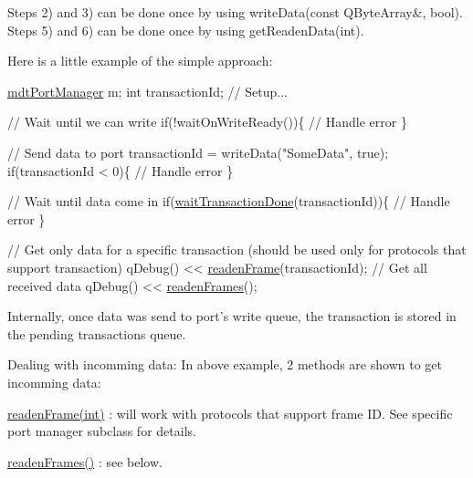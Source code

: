 Steps 2) and 3) can be done once by using write\-Data(const Q\-Byte\-Array\&, bool). Steps 5) and 6) can be done once by using get\-Readen\-Data(int).

Here is a little example of the simple approach\-: 
\begin{DoxyCode}
\hyperlink{classmdt_port_manager}{mdtPortManager} m;
\textcolor{keywordtype}{int} transactionId;
\textcolor{comment}{// Setup...}

\textcolor{comment}{// Wait until we can write}
\textcolor{keywordflow}{if}(!waitOnWriteReady())\{
  \textcolor{comment}{// Handle error}
\}

\textcolor{comment}{// Send data to port}
transactionId = writeData(\textcolor{stringliteral}{"SomeData"}, \textcolor{keyword}{true});
\textcolor{keywordflow}{if}(transactionId < 0)\{
  \textcolor{comment}{// Handle error}
\}

\textcolor{comment}{// Wait until data come in}
\textcolor{keywordflow}{if}(\hyperlink{classmdt_port_manager_a5551802de2c08632078f2cc0e2607913}{waitTransactionDone}(transactionId))\{
  \textcolor{comment}{// Handle error}
\}

\textcolor{comment}{// Get only data for a specific transaction (should be used only for protocols that support transaction)}
qDebug() << \hyperlink{classmdt_port_manager_a830ae182d06dd6a52c43a7f45b9240ac}{readenFrame}(transactionId);
\textcolor{comment}{// Get all received data}
qDebug() << \hyperlink{classmdt_port_manager_addd5dcae9644cea42a9871205af41796}{readenFrames}();
\end{DoxyCode}


Internally, once data was send to port's write queue, the transaction is stored in the pending transactions queue.

Dealing with incomming data\-: In above example, 2 methods are shown to get incomming data\-:
\begin{DoxyItemize}
\item \hyperlink{classmdt_port_manager_a830ae182d06dd6a52c43a7f45b9240ac}{readen\-Frame(int)} \-: will work with protocols that support frame I\-D. See specific port manager subclass for details.
\item \hyperlink{classmdt_port_manager_addd5dcae9644cea42a9871205af41796}{readen\-Frames()} \-: see below.
\end{DoxyItemize}

